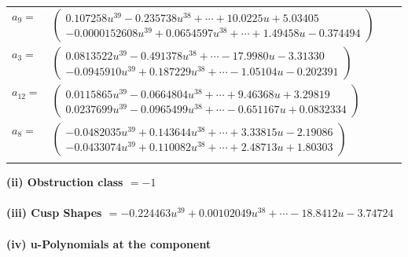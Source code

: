 \documentclass[1p]{elsarticle_modified}
\theoremstyle{definition}
\begin{document}
\begin{tabular}{m{7pt} m{180pt} m{7pt} m{180pt} }
\flushright $a_{9}=$&$\begin{pmatrix}0.107258 u^{39}-0.235738 u^{38}+\cdots+10.0225 u+5.03405\\-0.0000152608 u^{39}+0.0654597 u^{38}+\cdots+1.49458 u-0.374494\end{pmatrix}$ \\
\flushright $a_{3}=$&$\begin{pmatrix}0.0813522 u^{39}-0.491378 u^{38}+\cdots-17.9980 u-3.31330\\-0.0945910 u^{39}+0.187229 u^{38}+\cdots-1.05104 u-0.202391\end{pmatrix}$ \\
\flushright $a_{12}=$&$\begin{pmatrix}0.0115865 u^{39}-0.0664804 u^{38}+\cdots+9.46368 u+3.29819\\0.0237699 u^{39}-0.0965499 u^{38}+\cdots-0.651167 u+0.0832334\end{pmatrix}$ \\
\flushright $a_{8}=$&$\begin{pmatrix}-0.0482035 u^{39}+0.143644 u^{38}+\cdots+3.33815 u-2.19086\\-0.0433074 u^{39}+0.110082 u^{38}+\cdots+2.48713 u+1.80303\end{pmatrix}$\\&\end{tabular}
\flushleft \textbf{(ii) Obstruction class $= -1$}\\~\\
\flushleft \textbf{(iii) Cusp Shapes $= -0.224463 u^{39}+0.00102049 u^{38}+\cdots-18.8412 u-3.74724$}\\~\\
\newpage\renewcommand{\arraystretch}{1}
\flushleft \textbf{(iv) u-Polynomials at the component}\newline \\
\end{document}

